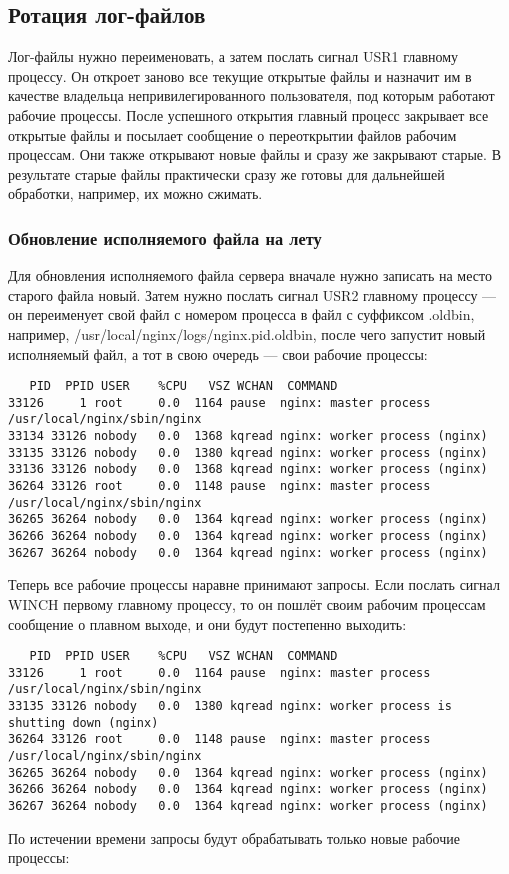 \documentclass[a4paper,10pt,twoside]{article}
\begin{document}
\subsection{Ротация лог-файлов}
Лог-файлы нужно переименовать, а затем послать сигнал USR1 главному процессу. Он откроет заново все текущие открытые файлы и назначит им в качестве владельца непривилегированного пользователя, под которым работают рабочие процессы. После успешного открытия главный процесс закрывает все открытые файлы и посылает сообщение о переоткрытии файлов рабочим процессам. Они также открывают новые файлы и сразу же закрывают старые. В результате старые файлы практически сразу же готовы для дальнейшей обработки, например, их можно сжимать.

\subsubsection{Обновление исполняемого файла на лету}
Для обновления исполняемого файла сервера вначале нужно записать на место старого файла новый. Затем нужно послать сигнал USR2 главному процессу — он переименует свой файл с номером процесса в файл с суффиксом .oldbin, например, /usr/local/nginx/logs/nginx.pid.oldbin, после чего запустит новый исполняемый файл, а тот в свою очередь — свои рабочие процессы:

\begin{verbatim}
   PID  PPID USER    %CPU   VSZ WCHAN  COMMAND
33126     1 root     0.0  1164 pause  nginx: master process /usr/local/nginx/sbin/nginx
33134 33126 nobody   0.0  1368 kqread nginx: worker process (nginx)
33135 33126 nobody   0.0  1380 kqread nginx: worker process (nginx)
33136 33126 nobody   0.0  1368 kqread nginx: worker process (nginx)
36264 33126 root     0.0  1148 pause  nginx: master process /usr/local/nginx/sbin/nginx
36265 36264 nobody   0.0  1364 kqread nginx: worker process (nginx)
36266 36264 nobody   0.0  1364 kqread nginx: worker process (nginx)
36267 36264 nobody   0.0  1364 kqread nginx: worker process (nginx)
\end{verbatim} 
Теперь все рабочие процессы наравне принимают запросы. Если послать сигнал WINCH первому главному процессу, то он пошлёт своим рабочим процессам сообщение о плавном выходе, и они будут постепенно выходить:

\begin{verbatim}
   PID  PPID USER    %CPU   VSZ WCHAN  COMMAND
33126     1 root     0.0  1164 pause  nginx: master process /usr/local/nginx/sbin/nginx
33135 33126 nobody   0.0  1380 kqread nginx: worker process is shutting down (nginx)
36264 33126 root     0.0  1148 pause  nginx: master process /usr/local/nginx/sbin/nginx
36265 36264 nobody   0.0  1364 kqread nginx: worker process (nginx)
36266 36264 nobody   0.0  1364 kqread nginx: worker process (nginx)
36267 36264 nobody   0.0  1364 kqread nginx: worker process (nginx)
\end{verbatim} 
По истечении времени запросы будут обрабатывать только новые рабочие процессы:
\end{document}
